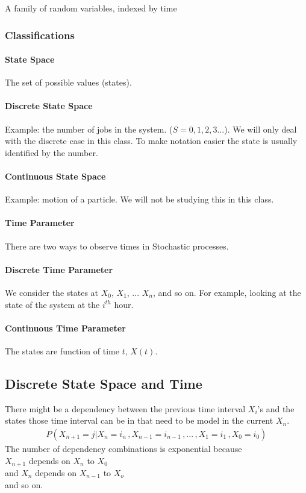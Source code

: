 
A family of random variables, indexed by time

\subsubsection{Classifications}

\paragraph{State Space} The set of possible values (states).
\paragraph{Discrete State Space} Example: the number of jobs in the system.
($S = {0,1,2,3...}$). We will only deal with the discrete case in this class. To
make notation easier the state is usually identified by the number.

\paragraph{Continuous State Space} Example: motion of a particle. We will not be
studying this in this class.

\paragraph{Time Parameter} There are two ways to observe times in Stochastic
processes.

\paragraph{Discrete Time Parameter} We consider the states at
$X_0$, $X_1$, ... $X_n$, and so on. For example, looking at the state of the
system at the $i^{th}$ hour.

%

\paragraph{Continuous Time Parameter}
The states are function of time $t$, $X(t)$.

\subsection{Discrete State Space and Time} There might be a dependency
between the previous time interval $X_i$'s and the states those time interval
can be in that need to be model in the current $X_n$. 
\begin{equation*} \begin{split}
	P(X_{n+1} = j | X_n = i_n\, , X_{n-1} = i_{n-1}\, , ... \, , X_1 = i_1\, ,X_0 = i_0)
\end{split} \end{equation*}
The number of dependency combinations is exponential because \\
$X_{n+1}$ depends on $X_n$ to $X_0$ \\
and $X_{n}$ depends on $X_{n-1}$ to $X_o$ \\
and so on. 

